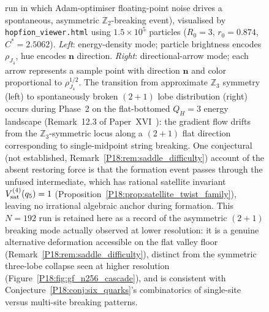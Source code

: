 \documentclass[11pt,a4paper]{article}
\theoremstyle{definition}\newtheorem{definition}[theorem]{Definition}
\theoremstyle{remark}
\newcommand{\QH}{Q_H}
\newcommand{\Ztwo}{\mathbb{Z}_2}
\newcommand{\Jones}{V}
\begin{document}
\begin{figure}[htp]
{    run in which Adam-optimiser floating-point noise drives a
    spontaneous, asymmetric $\Ztwo$-breaking event), visualised by
    \texttt{hopfion\_viewer.html} using $1.5\times10^5$ particles
    ($R_0=3$, $r_0=0.874$, $C^*=2.5062$).
    \emph{Left}: energy-density mode; particle brightness
    encodes $\rho_{J_4}$, hue encodes $\mathbf{n}$ direction.
    \emph{Right}: directional-arrow mode; each arrow represents
    a sample point with direction $\mathbf{n}$ and color
    proportional to $\rho_{J_4}^{1/2}$.
    The transition from approximate $\mathbb{Z}_3$ symmetry (left)
    to spontaneously broken $(2{+}1)$ lobe distribution (right)
    occurs during Phase~2 on the flat-bottomed $\QH=3$ energy
    landscape (Remark~12.3 of Paper~XVI~\cite{Paper16}): %
    the gradient flow drifts from the $\mathbb{Z}_3$-symmetric locus
    along a $(2{+}1)$ flat direction corresponding to
    single-midpoint string breaking.  One conjectural (not established,
    Remark~\ref{P18:rem:saddle_difficulty}) account of the absent
    restoring force is that the formation event passes through the
    unfused intermediate, which has rational satellite invariant
    $\Jones_{\rm sat}^{(4)}(q_5)=1$
    (Proposition~\ref{P18:prop:satellite_twist_family}), leaving no
    irrational algebraic anchor during formation.  This $N=192$ run is retained
    here as a record of the asymmetric $(2{+}1)$ breaking mode
    actually observed at lower resolution: it is a genuine alternative
    deformation accessible on the flat valley floor
    (Remark~\ref{P18:rem:saddle_difficulty}), distinct from the
    symmetric three-lobe collapse seen at higher resolution
    (Figure~\ref{P18:fig:gf_n256_cascade}), and is consistent with
    Conjecture~\ref{P18:conj:six_quarks}'s combinatorics of
    single-site versus multi-site breaking patterns.}
    \label{P18:fig:gf_n192_snapshots}
\end{figure}
\end{document}
